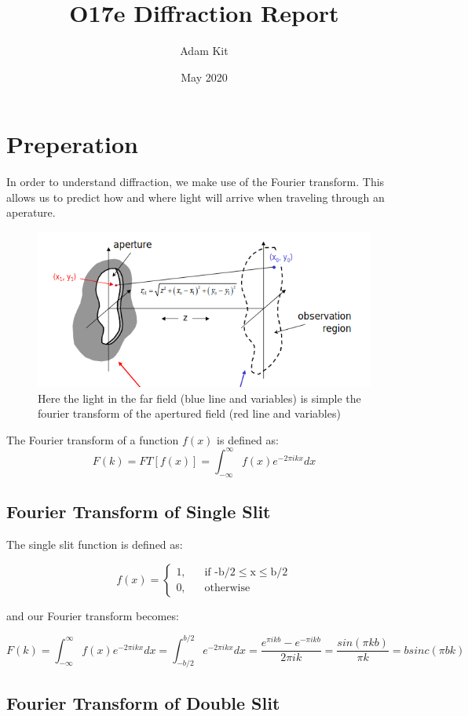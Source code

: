 \documentclass{article}
\title{O17e Diffraction Report}
\author{Adam Kit}
\date{May 2020}
\begin{document}
\maketitle

\section{Preperation}
In order to understand diffraction, we make use of the Fourier transform. This allows us to predict how and where light will arrive when traveling through an aperature.
\begin{figure}[h]
  \includegraphics[scale=0.5]{fraunhofferdiffraction.png}
  \caption{Here the light in the far field (blue line and variables) is simple the fourier transform of the apertured field (red line and variables)}
\end{figure}


The Fourier transform of a function $f(x)$ is defined as:
$$ F(k) = FT[f(x)]=\int_{-\infty}^{\infty}f(x)e^{-2\pi ikx} dx$$
\subsection{Fourier Transform of Single Slit}
The single slit function is defined as:

\[
f(x) =
  \begin{cases}
    \text{1,} &\quad\text{if -b/2}\le\text{x}\le\text{b/2} \\
    \text{0,} &\quad\text{otherwise}
  \end{cases}
\]

and our Fourier transform becomes:

$$F(k) = \int_{-\infty}^{\infty}f(x)e^{-2\pi ikx}dx = \int_{-b/2}^{b/2}e^{- 2\pi ikx}dx = \frac{e^{\pi ikb}-e^{-\pi ikb}}{2\pi ik} = \frac{sin(\pi kb)}{\pi k} = bsinc(\pi bk) $$

\subsection{Fourier Transform of Double Slit}
\end{document}
